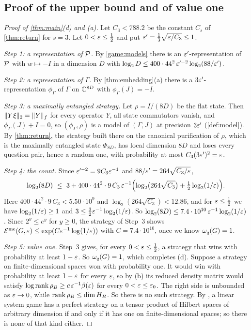 \subsection{Proof of the upper bound and of value one}

\begin{proof}[Proof of \cref{thm:main}(d) and (a)]
Let $C_3<788.2$ be the constant $C_s$ of \cref{thm:return} for $s=3$. Let $0<\varepsilon\le\frac12$ and put $\varepsilon'=\frac13\sqrt{\varepsilon/C_3}\le1$.

\emph{Step 1: a representation of $\mathcal P$.} By \cref{game:models} there is an $\varepsilon'$-representation of $\mathcal P$ with $w\mapsto-I$ in a
dimension $D$ with $\log_2D\le400\cdot44^2\,\varepsilon'^{-2}\log_2(88/\varepsilon')$.

\emph{Step 2: a representation of $\Gamma$.} By \cref{thm:embedding}(a) there is a $3\varepsilon'$-representation $\phi_\Gamma$ of $\Gamma$ on
$\mathbb C^{8D}$ with $\phi_\Gamma(J)=-I$.

\emph{Step 3: a maximally entangled strategy.} Let $\rho=I/(8D)$ be the flat state. Then $\lVert Y\xi\rVert_2=\lVert Y\rVert_f$ for every operator $Y$, all state
commutators vanish, and $\phi_\Gamma(J)+I=0$, so $(\phi_\Gamma,\rho)$ is a model of $(\Gamma,J)$ at precision $3\varepsilon'$
(\cref{def:model}). By \cref{thm:return}, the strategy built there on the canonical purification of $\rho$, which is the maximally
entangled state $\Phi_{8D}$, has local dimension $8D$ and loses every question pair, hence a random one, with probability at most
$C_3(3\varepsilon')^2=\varepsilon$.

\emph{Step 4: the count.} Since $\varepsilon'^{-2}=9C_3\varepsilon^{-1}$ and $88/\varepsilon'=264\sqrt{C_3/\varepsilon}$,
\[
\log_2(8D)\ \le\ 3+400\cdot44^2\cdot9\,C_3\,\eps^{-1}\Bigl(\log_2\bigl(264\sqrt{C_3}\bigr)+\tfrac12\log_2(1/\eps)\Bigr).
\]
Here $400\cdot44^2\cdot9\,C_3<5.50\cdot10^9$ and $\log_2(264\sqrt{C_3})<12.86$, and for $\varepsilon\le\frac12$ we have $\log_2(1/\varepsilon)\ge1$ and
$3\le\frac32\varepsilon^{-1}\log_2(1/\varepsilon)$. So $\log_2(8D)\le7.4\cdot10^{10}\,\varepsilon^{-1}\log_2(1/\varepsilon)$. Since $2^y\le e^y$ for $y\ge0$, the strategy
of Step~3 shows $\mathcal E^{\mathrm{me}}(G,\varepsilon)\le\exp(C\varepsilon^{-1}\log(1/\varepsilon))$ with $C=7.4\cdot10^{10}$, once we know $\omega_{q}(G)=1$.

\emph{Step 5: value one.} Step~3 gives, for every $0<\varepsilon\le\frac12$, a strategy that wins with probability at least $1-\varepsilon$. So
$\omega_{q}(G)=1$, which completes (d). Suppose a strategy on finite-dimensional spaces won with probability one. It would win with probability at
least $1-\varepsilon$ for every $\varepsilon$, so by (b) its reduced density matrix would satisfy $\log\operatorname{rank}\rho_B\ge c\,\varepsilon^{-1}\beta(\varepsilon)$ for every
$0<\varepsilon\le\varepsilon_0$. The right side is unbounded as $\varepsilon\to0$, while $\operatorname{rank}\rho_B\le\dim H_B$. So there is no such strategy. By
\cite[Thm.~3.2]{Slo19}, a linear system game has a perfect strategy on a tensor product of Hilbert spaces of arbitrary dimension if and only
if it has one on finite-dimensional spaces; so there is none of that kind either.
\end{proof}

